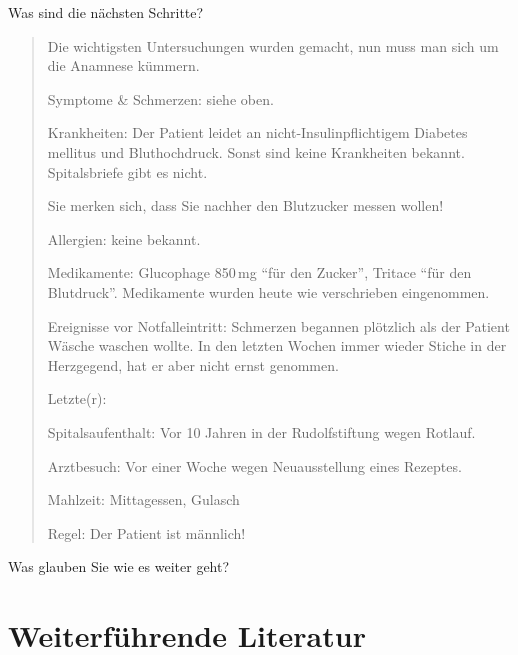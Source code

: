 Was sind die nächsten Schritte?

\begin{quote}
  Die wichtigsten Untersuchungen wurden gemacht, nun muss man sich um die
  Anamnese kümmern.
  
  Symptome \& Schmerzen: siehe oben.
  
  Krankheiten: Der Patient leidet an nicht-Insulinpflichtigem Diabetes
  mellitus und Bluthochdruck. Sonst sind keine Krankheiten bekannt.
  Spitalsbriefe gibt es nicht.
  
  Sie merken sich, dass Sie nachher den Blutzucker messen wollen!
  
  Allergien: keine bekannt.
  
  Medikamente: Glucophage 850\,mg "`für den Zucker"', Tritace "`für den
  Blutdruck"'. Medikamente wurden heute wie verschrieben eingenommen.
  
  Ereignisse vor Notfalleintritt: Schmerzen begannen plötzlich als der
  Patient Wäsche waschen wollte. In den letzten Wochen immer wieder
  Stiche in der Herzgegend, hat er aber nicht ernst genommen.
  
  Letzte(r):
  
  Spitalsaufenthalt: Vor 10 Jahren in der Rudolfstiftung wegen Rotlauf.
  
  Arztbesuch: Vor einer Woche wegen Neuausstellung eines Rezeptes.
  
  Mahlzeit: Mittagessen, Gulasch
  
  Regel: Der Patient ist männlich!
\end{quote}
% 

Was glauben Sie wie es weiter geht?

\TakeNotesLarge


\section*{Weiterführende Literatur}
\cite{SudoweProfHandelnRD1,
AMLS3,
PHTLS6,
emergency9,
SemmelABC1,
KirschnickPflege2,
RueckerBildatlas1}